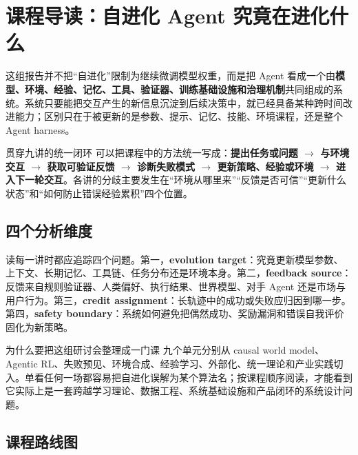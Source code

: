 \section{课程导读：自进化 Agent 究竟在进化什么}

这组报告并不把“自进化”限制为继续微调模型权重，而是把 Agent 看成一个由\textbf{模型、环境、经验、记忆、工具、验证器、训练基础设施和治理机制}共同组成的系统。系统只要能把交互产生的新信息沉淀到后续决策中，就已经具备某种跨时间改进能力；区别只在于被更新的是参数、提示、记忆、技能、环境课程，还是整个 Agent harness。

\begin{importantbox}{贯穿九讲的统一闭环}
可以把课程中的方法统一写成：\textbf{提出任务或问题 $\rightarrow$ 与环境交互 $\rightarrow$ 获取可验证反馈 $\rightarrow$ 诊断失败模式 $\rightarrow$ 更新策略、经验或环境 $\rightarrow$ 进入下一轮交互}。各讲的分歧主要发生在“环境从哪里来”“反馈是否可信”“更新什么状态”和“如何防止错误经验累积”四个位置。
\end{importantbox}

\subsection{四个分析维度}

读每一讲时都应追踪四个问题。第一，\textbf{evolution target}：究竟更新模型参数、上下文、长期记忆、工具链、任务分布还是环境本身。第二，\textbf{feedback source}：反馈来自规则验证器、人类偏好、执行结果、世界模型、对手 Agent 还是市场与用户行为。第三，\textbf{credit assignment}：长轨迹中的成功或失败应归因到哪一步。第四，\textbf{safety boundary}：系统如何避免把偶然成功、奖励漏洞和错误自我评价固化为新策略。

\begin{knowledgebox}{为什么要把这组研讨会整理成一门课}
九个单元分别从 causal world model、Agentic RL、失败预见、环境合成、经验学习、外部化、统一理论和产业实践切入。单看任何一场都容易把自进化误解为某个算法名；按课程顺序阅读，才能看到它实际上是一套跨越学习理论、数据工程、系统基础设施和产品闭环的系统设计问题。
\end{knowledgebox}

\subsection{课程路线图}

